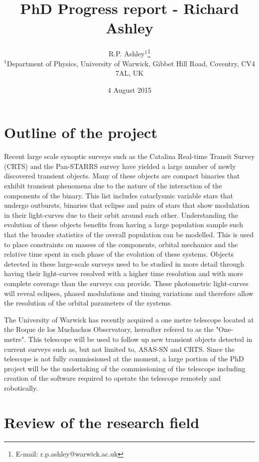 \documentclass[a4paper,fleqn,usenatbib]{mnras}
\title[Richard Ashley - PhD project]{PhD Progress report - Richard Ashley}
\author[R.P. Ashley et al.]{
R.P. Ashley$^{1}$\thanks{E-mail: r.p.ashley@warwick.ac.uk}\\
$^{1}$Department of Physics, University of Warwick, Gibbet Hill Road, Coventry, CV4 7AL, UK\\
}
\date{4 August 2015}
\begin{document}
\label{firstpage}
\pagerange{\pageref{firstpage}--\pageref{lastpage}}
\maketitle




\section{Outline of the project}
Recent large scale synoptic surveys such as the Catalina Real-time Transit Survey (CRTS)  and the Pan-STARRS survey have yielded a large number of newly discovered transient objects. Many of these objects are compact binaries that exhibit transient phenomena due to the nature of the interaction of the components of the binary. This list includes cataclysmic variable stars that undergo outbursts, binaries that eclipse and pairs of stars that show modulation in their light-curves due to their orbit around each other. Understanding the evolution of these objects benefits from having a large population sample such that the broader statistics of the overall population can be modelled. This is used to place constraints on masses of the components, orbital mechanics and the relative time spent in each phase of the evolution of these systems. Objects detected in these large-scale surveys need to be studied in more detail through having their light-curves resolved with a higher time resolution and with more complete coverage than the surveys can provide. These photometric light-curves will reveal eclipses, phased modulations and timing variations and therefore allow the resolution of the orbital parameters of the systems. 

The University of Warwick has recently acquired a one metre telescope located at the Roque de los Muchachos Observatory, hereafter refered to as the "One-metre". This telescope will be used to follow up new transient objects detected in current surveys such as, but not limited to, ASAS-SN and CRTS. Since the telescope is not fully commissioned at the moment, a large portion of the PhD project will be the undertaking of the commissioning of the telescope including creation of the software required to operate the telescope remotely and robotically. 

\section{Review of the research field}
\end{document}
